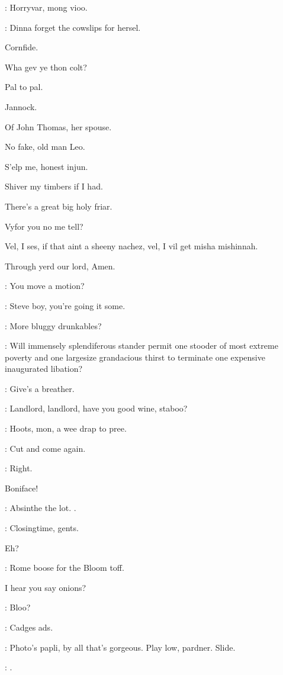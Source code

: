 \documentclass[12pt]{article}
\begin{document}
\Dx: Horryvar, mong vioo.

\Cr: Dinna forget the cowslips for hersel.

Cornfide.

Wha gev ye thon colt?

Pal to pal.

Jannock.

Of John Thomas, her spouse.

No fake, old man Leo.

S'elp me, honest injun.

Shiver my timbers if I had.

There's a great big holy friar.

Vyfor you no me tell?

Vel, I ses, if that aint a sheeny nachez, vel, I vil get misha mishinnah.

Through yerd our lord, Amen.


\SD: You move a motion?

\Ln: Steve boy, you're going it some.

\Dx: More bluggy drunkables?

\Ly: Will immensely splendiferous stander permit one stooder of
most extreme poverty and one largesize grandacious thirst to terminate
one expensive inaugurated libation?

\Cr: Give's a breather.

\PC: Landlord, landlord, have you good wine, staboo?

\Cr: Hoots, mon, a wee drap to pree.

\Ln: Cut and come again.

\Br: Right.

Boniface!

\SD: Absinthe the lot.
.

\Br: Closingtime, gents.

Eh?

\SD: Rome boose for the Bloom toff.

I hear you say onions?

\Ba: Bloo?

\Dx: Cadges ads.

\Ba: Photo's papli, by all that's gorgeous.
Play low, pardner.
Slide.

\Mu: .

\end{document}
